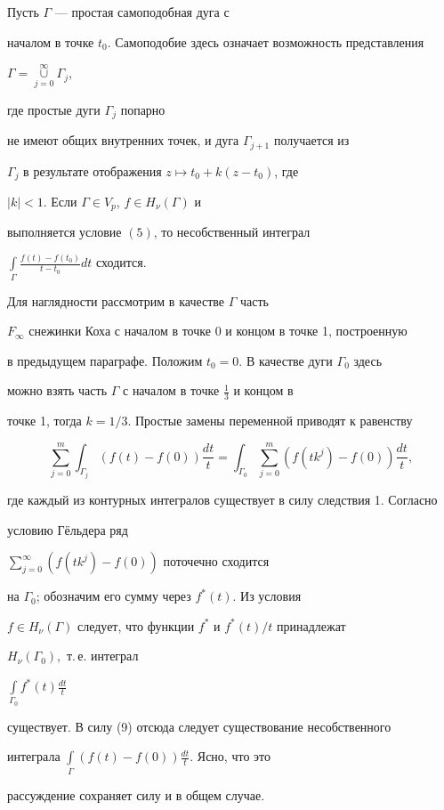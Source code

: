 \begin{prop}


Пусть $\Gamma$ --- простая самоподобная дуга с


началом в точке $t_0$. Самоподобие здесь означает возможность представления


$\Gamma =\mathop{\cup}\limits_{j=0}^{\infty}\Gamma_j$,


где простые дуги $\Gamma_j$ попарно


не имеют общих внутренних точек, и дуга $\Gamma_{j+1}$ получается из


$\Gamma_j$ в результате отображения $z\mapsto t_0 + k(z - t_0)$, где


$|k| <1.$ Если $\Gamma\in V_{p}$, $f\in H_{\nu}(\Gamma)$ и


выполняется условие $(5)$, то несобственный интеграл


$\int\limits_{\Gamma}\frac{f(t) - f(t_0)}{t-t_0}dt$ сходится.


\end{prop}





\begin{pf}


Для наглядности рассмотрим в качестве $\Gamma$ часть


$F_\infty$ снежинки Коха с началом в точке 0 и концом в точке 1, построенную


в предыдущем параграфе. Положим $t_0 =0$. В качестве дуги $\Gamma_0$ здесь


можно взять часть $\Gamma$ с началом в точке $\frac{1}{3}$ и концом в


точке 1, тогда $k=1/3$. Простые замены переменной приводят к равенству


\begin{equation}


\sum_{j=0}^{m}\int_{\Gamma_j}(f(t)-f(0))\frac{dt}{t} =


\int_{\Gamma_0}\sum_{j=0}^{m}(f(tk^j)-f(0))\frac{dt}{t},


\end{equation}


где каждый из контурных интегралов существует в силу следствия 1. Согласно


условию Г\"ельдера ряд


$\sum\limits_{j=0}^{\infty}(f(tk^j)-f(0))$ поточечно сходится


на $\Gamma_0$; обозначим его сумму через $f^*(t)$. Из условия


$f\in H_{\nu}(\Gamma)$ следует, что функции $f^*$ и $f^*(t)/t$ принадлежат


$H_{\nu}(\Gamma_0),$ т.\,е. интеграл


$\int\limits_{\Gamma_0}f^*(t)\frac{dt}{t}$


существует. В силу (9) отсюда следует существование несобственного


интеграла $\int\limits_{\Gamma}(f(t)-f(0))\frac{dt}{t}.$ Ясно, что это


рассуждение сохраняет силу и в общем случае.


\end{pf}





